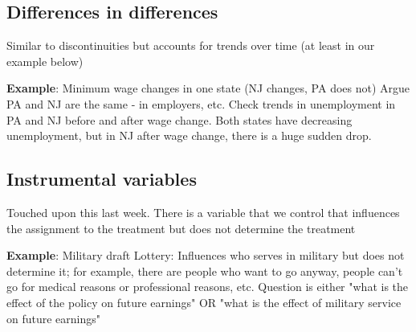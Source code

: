 \subsection{Differences in differences}
Similar to discontinuities but accounts for trends over time (at least in our example below) \newline

\textbf{Example}: Minimum wage changes in one state (NJ changes, PA does not) \newline
Argue PA and NJ are the same - in employers, etc. Check trends in unemployment in PA and NJ before and after wage change. Both states have decreasing unemployment, but in NJ after wage change, there is a huge sudden drop. 
\subsection{Instrumental variables}
Touched upon this last week. There is a variable that we control that influences the assignment to the treatment but does not determine the treatment \newline

\textbf{Example}: Military draft \newline
Lottery: Influences who serves in military but does not determine it; for example, there are  people who want to go anyway, people can't go for medical reasons or professional reasons, etc. Question is either "what is the effect of the policy on future earnings" OR "what is the effect of military service on future earnings" \newline

